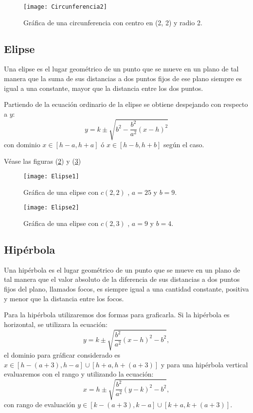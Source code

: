 \documentclass[12pt,a4paper]{article}
\begin{document}
\begin{figure}
\centering
\texttt{[image: Circunferencia2]}
\caption{Gráfica de una circunferencia con centro en (2, 2) y radio 2.}
\label{fig:circunferencia-2}
\end{figure}

\newpage
\subsection{Elipse}

Una elipse es el lugar geométrico de un punto que se mueve en un plano de tal manera que la suma de sus distancias a dos puntos fijos de ese plano siempre es igual a una constante, mayor que la distancia entre los dos puntos.

Partiendo de la ecuación ordinario de la elipse se obtiene despejando con respecto a $y$:
\begin{equation}
y = k \pm \sqrt{b^2 - \frac{b^2}{a^2}(x - h)^2} \label{eq:elipse}
\end{equation}
con dominio $x \in [h - a, h + a]$ ó $x \in [h - b, h + b]$ según el caso. 

Véase las figuras (\ref{fig:elipse-1}) y (\ref{fig:elipse-2})

\begin{figure}
\centering
\texttt{[image: Elipse1]}
\caption{Gráfica de una elipse con $c(2, 2)$ , $a = 25$ y $b = 9$.}
\label{fig:elipse-1}
\end{figure}

\begin{figure}
\centering
\texttt{[image: Elipse2]}
\caption{Gráfica de una elipse con $c(2, 3)$ , $a = 9$ y $b = 4$.}
\label{fig:elipse-2}
\end{figure}


\newpage
\subsection{Hipérbola}

Una hipérbola es el lugar geométrico de un punto que se mueve en un plano de tal manera que el valor absoluto de la diferencia de sus distancias a dos puntos fijos del plano, llamados focos, es siempre igual a una cantidad constante, positiva y menor que la distancia entre los focos.

Para la hipérbola utilizaremos dos formas para graficarla. Si la hipérbola es horizontal, se utilizara la ecuación:
\begin{equation}
y = k \pm \sqrt{\frac{b^2}{a^2}(x - h)^2 - b^2}, \label{eq:hiperbolah}
\end{equation}
el dominio para gráficar considerado es $x \in [h - (a + 3), h - a] \cup [h + a, h + (a + 3)]$ y para una hipérbola vertical evaluaremos con el rango y utilizando la ecuación:
\begin{equation}
x = h \pm \sqrt{\frac{b^2}{a^2}(y - k)^2 - b^2}, \label{eq:hiperobolav}
\end{equation}
con rango de evaluación $y \in [k - (a + 3), k - a] \cup [k + a, k + (a + 3)]$.
\end{document}

